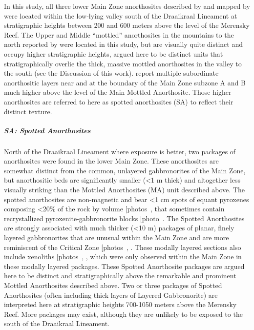  

In this study, all three lower Main Zone anorthosites described by
\citet{latypovetal2022} and mapped by \citet{vandermerwe2007} were located
within the low-lying valley south of the Draaikraal Lineament at
stratigraphic heights between 200 and 600 meters above the level of the
Merensky Reef. The Upper and Middle ``mottled'' anorthosites in the
mountains to the north reported by \citet{latypovetal2022} were located in
this study, but are visually quite distinct and occupy higher
stratigraphic heights, argued here to be
distinct units that stratigraphically overlie the thick, massive mottled
anorthosites in the valley to the south (see the Discussion of this
work). \citet{vongruenewaldt1985} report multiple subordinate
anorthositic layers near and at the boundary of the Main Zone subzone A
and B much higher above the level of the Main Mottled Anorthosite. Those
higher anorthosites are referred to here as spotted anorthosites (SA) to
reflect their distinct texture. 

\subparagraph{SA: Spotted Anorthosites}
\label{sec:ch5-unit-sa}

North of the Draaikraal Lineament where exposure is better, two packages
of anorthosites were found in the lower Main Zone. These anorthosites
are somewhat distinct from the common, unlayered gabbronorites of the
Main Zone, but anorthositic beds are significantly smaller (\textless1 m
thick) and altogether less visually striking than the Mottled
Anorthosites (MA) unit described above. The spotted anorthosites are
non-magnetic and bear \textless1 cm spots of equant pyroxenes composing
\textless20\% of the rock by volume {[}photos~, \ChFivePhoto{87}{]} that sometimes
contain recrystallized pyroxenite-gabbronorite blocks {[}photo~\ChFivePhoto{111}{]}.
The Spotted Anorthosites are strongly associated with much thicker
(\textless10 m) packages of planar, finely layered gabbronorites that
are unusual within the Main Zone and are more reminiscent of the
Critical Zone {[}photos~, \ChFivePhoto{112}{]}. These modally layered sections also
include xenoliths {[}photos~, \ChFivePhoto{84}{]}, which were only observed within
the Main Zone in these modally layered packages. These Spotted
Anorthosite packages are argued here to be distinct and
stratigraphically above the remarkable and prominent Mottled
Anorthosites described above. Two or three packages of Spotted
Anorthosites (often including thick layers of Layered Gabbronorite) are
interpreted here at stratigraphic heights 700-1050 meters above the
Merensky Reef. More packages may exist, although they are unlikely to be
exposed to the south of the Draaikraal Lineament.

